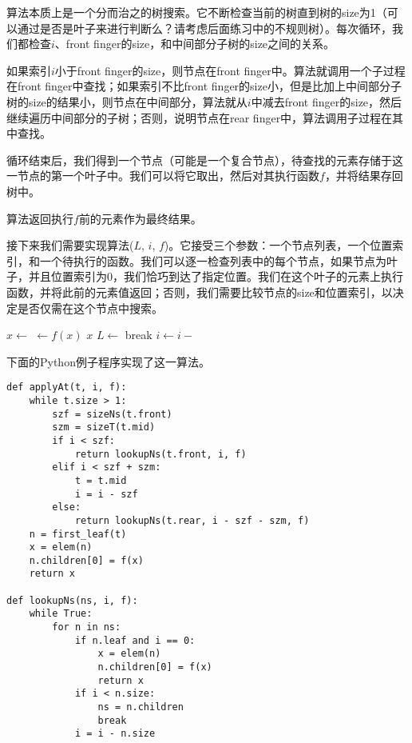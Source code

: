 \documentclass[UTF8]{article}
\begin{document}
算法本质上是一个分而治之的树搜索。它不断检查当前的树直到树的size为1（可以通过是否是叶子来进行判断么？请考虑后面练习中的不规则树）。每次循环，我们都检查$i$、front finger的size，和中间部分子树的size之间的关系。

如果索引$i$小于front finger的size，则节点在front finger中。算法就调用一个子过程在front finger中查找；如果索引不比front finger的size小，但是比加上中间部分子树的size的结果小，则节点在中间部分，算法就从$i$中减去front finger的size，然后继续遍历中间部分的子树；否则，说明节点在rear finger中，算法调用子过程在其中查找。

循环结束后，我们得到一个节点（可能是一个复合节点），待查找的元素存储于这一节点的第一个叶子中。我们可以将它取出，然后对其执行函数$f$，并将结果存回树中。

算法返回执行$f$前的元素作为最终结果。

接下来我们需要实现算法($L$, $i$, $f$)。它接受三个参数：一个节点列表，一个位置索引，和一个待执行的函数。我们可以逐一检查列表中的每个节点，如果节点为叶子，并且位置索引为0，我们恰巧到达了指定位置。我们在这个叶子的元素上执行函数，并将此前的元素值返回；否则，我们需要比较节点的size和位置索引，以决定是否仅需在这个节点中搜索。

\begin{algorithmic}
  \Loop
        \State $x \gets $ 
        \State {} $\gets f(x)$
        \State \Return $x$
      \EndIf
        \State $L \gets $ 
        \State break
      \EndIf
      \State $i \gets i - $ 
    \EndFor
  \EndLoop
\EndFunction
\end{algorithmic}

下面的Python例子程序实现了这一算法。

\lstset{language=Python}
\begin{lstlisting}
def applyAt(t, i, f):
    while t.size > 1:
        szf = sizeNs(t.front)
        szm = sizeT(t.mid)
        if i < szf:
            return lookupNs(t.front, i, f)
        elif i < szf + szm:
            t = t.mid
            i = i - szf
        else:
            return lookupNs(t.rear, i - szf - szm, f)
    n = first_leaf(t)
    x = elem(n)
    n.children[0] = f(x)
    return x

def lookupNs(ns, i, f):
    while True:
        for n in ns:
            if n.leaf and i == 0:
                x = elem(n)
                n.children[0] = f(x)
                return x
            if i < n.size:
                ns = n.children
                break
            i = i - n.size
\end{lstlisting}
\end{document}
